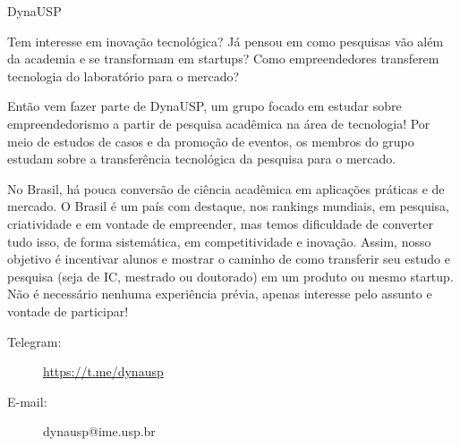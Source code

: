 \begin{subsecao}{DynaUSP}


Tem interesse em inovação tecnológica? Já pensou em como pesquisas
vão além da academia e se transformam em startups? Como empreendedores
transferem tecnologia do laboratório para o mercado? 

Então vem fazer parte de DynaUSP, um grupo focado em estudar sobre
empreendedorismo a partir de pesquisa acadêmica na área de tecnologia!
Por meio de estudos de casos e da promoção de eventos, os membros do grupo
estudam sobre a transferência tecnológica da pesquisa para o mercado.

No Brasil, há pouca conversão de ciência acadêmica em aplicações práticas e
de mercado. O Brasil é um país com destaque, nos rankings mundiais, em pesquisa,
criatividade e em vontade de empreender, mas temos dificuldade de converter tudo
isso, de forma sistemática, em competitividade e inovação. Assim, nosso objetivo
é incentivar alunos e mostrar o caminho de como transferir seu estudo e pesquisa
(seja de IC, mestrado ou doutorado) em um produto ou mesmo startup.  Não é
necessário nenhuma experiência prévia, apenas interesse pelo assunto e vontade
de participar!

\begin{description}
  \item[Telegram:] \url{https://t.me/dynausp}
  \item[E-mail:] dynausp@ime.usp.br
\end{description}

\end{subsecao}
